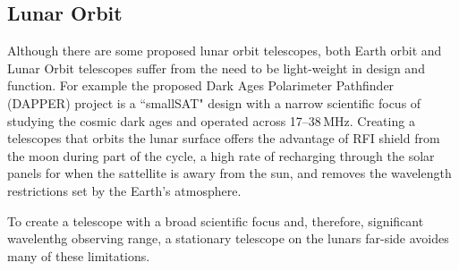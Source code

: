 \subsection{Lunar Orbit}
Although there are some proposed lunar orbit telescopes, both Earth orbit and Lunar Orbit telescopes suffer from the need to be light-weight in design and function. For example the proposed Dark Ages Polarimeter Pathfinder (DAPPER) project is a ``smallSAT" design with a narrow scientific focus of studying the cosmic dark ages and operated across 17--38\,MHz. Creating a telescopes that orbits the lunar surface offers the advantage of RFI shield from the moon during part of the cycle, a high rate of recharging through the solar panels for when the sattellite is awary from the sun, and removes the wavelength restrictions set by the Earth's atmosphere. 

To create a telescope with a broad scientific focus and, therefore, significant wavelenthg observing range, a stationary telescope on the lunars far-side avoides many of these limitations.